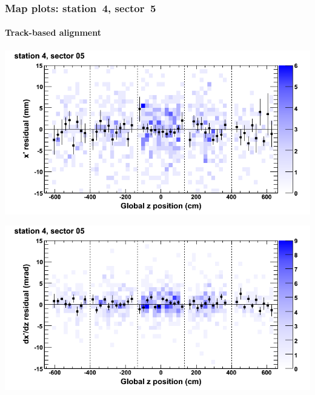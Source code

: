 \documentclass[compress]{beamer}
\begin{document}
\begin{frame}
\frametitle{Map plots: station~4, sector~5}
\framesubtitle{Track-based alignment}
\includegraphics[width=0.5\linewidth]{mapplots_re05/DTvsz_st4sec05_x.png}

\includegraphics[width=0.5\linewidth]{mapplots_re05/DTvsz_st4sec05_dxdz.png}
\end{frame}
\end{document}

